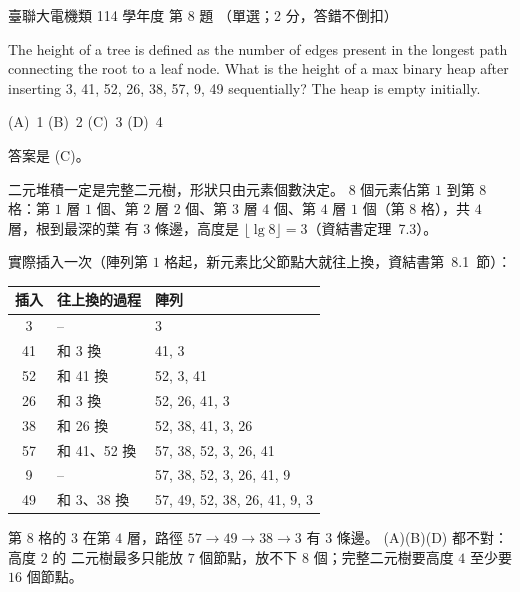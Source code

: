 \begin{pastexam}[label={px:ust-114-ee-ds-08}]{臺聯大電機類 114 學年度 第 8 題}
（單選；2 分，答錯不倒扣）

The height of a tree is defined as the number of edges present in the longest path connecting the
root to a leaf node. What is the height of a max binary heap after inserting 3, 41, 52, 26, 38, 57, 9,
49 sequentially? The heap is empty initially.

(A)~1 \qquad (B)~2 \qquad (C)~3 \qquad (D)~4
\end{pastexam}

\begin{pastsoln}
答案是 (C)。

二元堆積一定是完整二元樹，形狀只由元素個數決定。 $8$ 個元素佔第 $1$ 到第 $8$ 格：第 $1$ 層 $1$
個、第 $2$ 層 $2$ 個、第 $3$ 層 $4$ 個、第 $4$ 層 $1$ 個（第 $8$ 格），共 $4$ 層，根到最深的葉
有 $3$ 條邊，高度是 $\lfloor \lg 8 \rfloor = 3$（資結書定理~7.3）。

實際插入一次（陣列第 $1$ 格起，新元素比父節點大就往上換，資結書第~8.1~節）：
\begin{center}
\small
\begin{tabular}{cll}
\toprule
插入 & 往上換的過程 & 陣列 \\
\midrule
3 & -- & 3 \\
41 & 和 3 換 & 41, 3 \\
52 & 和 41 換 & 52, 3, 41 \\
26 & 和 3 換 & 52, 26, 41, 3 \\
38 & 和 26 換 & 52, 38, 41, 3, 26 \\
57 & 和 41、52 換 & 57, 38, 52, 3, 26, 41 \\
9 & -- & 57, 38, 52, 3, 26, 41, 9 \\
49 & 和 3、38 換 & 57, 49, 52, 38, 26, 41, 9, 3 \\
\bottomrule
\end{tabular}
\end{center}
第 $8$ 格的 $3$ 在第 $4$ 層，路徑 $57 \to 49 \to 38 \to 3$ 有 $3$ 條邊。 (A)(B)(D) 都不對：高度 $2$ 的
二元樹最多只能放 $7$ 個節點，放不下 $8$ 個；完整二元樹要高度 $4$ 至少要 $16$ 個節點。
\end{pastsoln}
